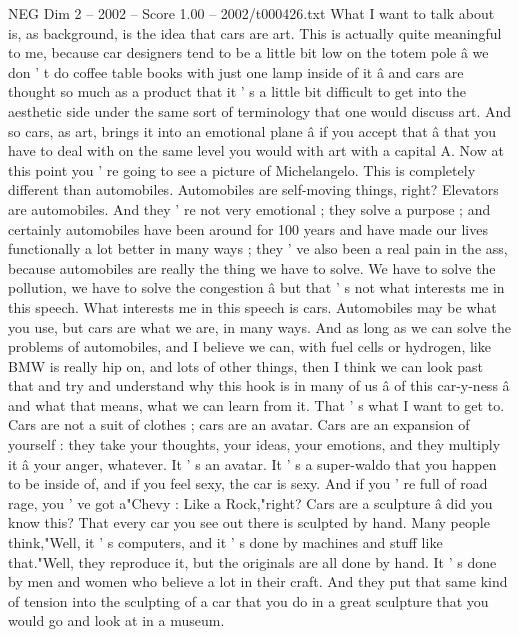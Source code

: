 \begin{textsample}{NEG Dim 2 – 2002 – Score 1.00 – 2002/t000426.txt}  \label{ex:f2_neg_041}
What I want to talk about is, as background, is the idea that cars are art.
This is actually quite meaningful to me, because car designers tend to be a little bit low on the totem pole â we don ' t do coffee table books with just one lamp inside of it â and cars are thought so much as a product that it ' s a little bit difficult to get into the aesthetic side under the same sort of terminology that one would discuss art.
And so cars, as art, brings it into an emotional plane â if you accept that â that you have to deal with on the same level you would with art with a capital A.
Now at this point you ' re going to see a picture of Michelangelo.
This is completely different than automobiles.
Automobiles are self-moving things, right?
Elevators are automobiles.
And they ' re not very emotional ; they solve a purpose ; and certainly automobiles have been around for 100 years and have made our lives functionally a lot better in many ways ; they ' ve also been a real pain in the ass, because automobiles are really the thing we have to solve.
We have to solve the pollution, we have to solve the congestion â but that ' s not what interests me in this speech.
What interests me in this speech is cars.
Automobiles may be what you use, but cars are what we are, in many ways.
And as long as we can solve the problems of automobiles, and I believe we can, with fuel cells or hydrogen, like BMW is really hip on, and lots of other things, then I think we can look past that and try and understand why this hook is in many of us â of this car-y-ness â and what that means, what we can learn from it.
That ' s what I want to get to.
Cars are not a suit of clothes ; cars are an avatar.
Cars are an expansion of yourself : they take your thoughts, your ideas, your emotions, and they multiply it â your anger, whatever.
It ' s an avatar.
It ' s a super-waldo that you happen to be inside of, and if you feel sexy, the car is sexy.
And if you ' re full of road rage, you ' ve got a"Chevy : Like a Rock,"right?
Cars are a sculpture â did you know this?
That every car you see out there is sculpted by hand.
Many people think,"Well, it ' s computers, and it ' s done by machines and stuff like that."Well, they reproduce it, but the originals are all done by hand.
It ' s done by men and women who believe a lot in their craft.
And they put that same kind of tension into the sculpting of a car that you do in a great sculpture that you would go and look at in a museum.

\end{textsample}
